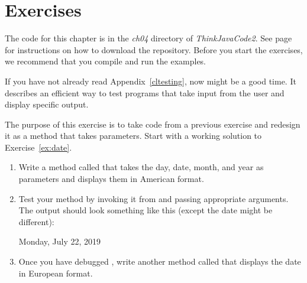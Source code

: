 \section{Exercises}

The code for this chapter is in the {\it ch04} directory of {\it ThinkJavaCode2}.
See page~\pageref{code} for instructions on how to download the repository.
Before you start the exercises, we recommend that you compile and run the examples.

If you have not already read Appendix~\ref{cltesting}, now might be a good time.
It describes an efficient way to test programs that take input from the user and display specific output.


\begin{exercise}  %

The purpose of this exercise is to take code from a previous exercise and redesign it as a method that takes parameters.
Start with a working solution to Exercise~\ref{ex:date}.

\vspace{-1em}
\begin{enumerate}

\item Write a method called  that takes the day, date, month, and year as parameters and displays them in American format.

\item Test your method by invoking it from  and passing appropriate arguments.
The output should look something like this (except the date might be different):

\begin{stdout}
Monday, July 22, 2019
\end{stdout}

\item Once you have debugged , write another method called  that displays the date in European format.

\end{enumerate}
\vspace{1ex}

\end{exercise}


